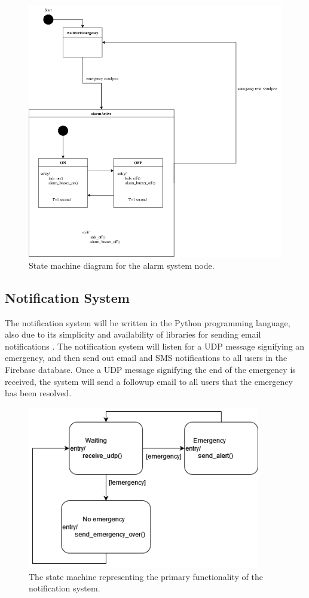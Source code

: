 \begin{figure}[H]
    \centering
    \includegraphics[width=\linewidth]{../assets/AlarmSystemStateMachine.png}
    \caption{State machine diagram for the alarm system node.}
\end{figure}

\subsection{Notification System}

The notification system will be written in the Python programming language, also due to its simplicity and availability
of libraries for sending email notifications \cite{python-email}. The notification system will listen for a UDP message
signifying an emergency, and then send out email and SMS notifications to all users in the Firebase database. Once a
UDP message signifying the end of the emergency is received, the system will send a followup email to all users that
the emergency has been resolved.

\begin{figure}[H]
    \centering
    \includegraphics[width=4in]{../assets/NotificationSystemStateMachine.png}
    \caption{The state machine representing the primary functionality of the notification system.}
\end{figure}


